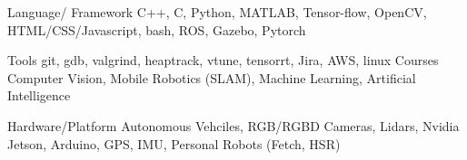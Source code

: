 \vspace{-2mm}

\begin{cvskills}

  \cvskill
    {Language/ Framework} %
    {C++, C, Python, MATLAB, Tensor-flow, OpenCV, HTML/CSS/Javascript, bash, ROS, Gazebo, Pytorch} %

	\cvskill
	{Tools} %
	{git, gdb, valgrind, heaptrack, vtune, tensorrt, Jira, AWS, linux } %
	\cvskill
	{Courses} %
	{Computer Vision, Mobile Robotics (SLAM), Machine Learning, Artificial Intelligence} %

	\cvskill
	{Hardware/Platform} %
	{Autonomous Vehciles, RGB/RGBD Cameras, Lidars, Nvidia Jetson, Arduino, GPS, IMU, Personal Robots (Fetch, HSR)} %

\end{cvskills}
